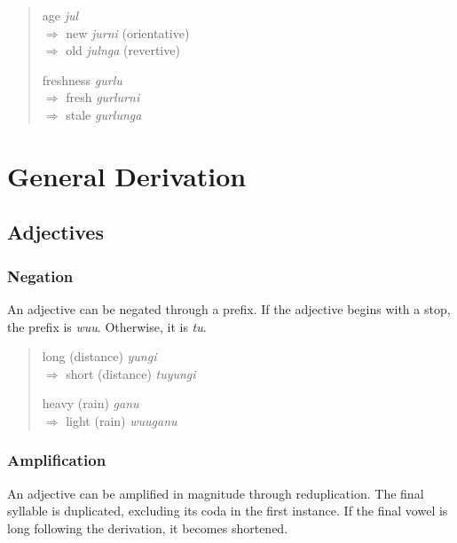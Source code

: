 \begin{quote}
\begin{multicols}{2}
age \textit{jul}\\
$\Rightarrow$ new \textit{jurni} (orientative)\\
$\Rightarrow$ old \textit{julnga} (revertive)

freshness \textit{gurlu}\\
$\Rightarrow$ fresh \textit{gurlurni}\\
$\Rightarrow$ stale \textit{gurlunga}
\end{multicols}
\end{quote}

\section{General Derivation}

\subsection{Adjectives}

\subsubsection{Negation}

An adjective can be negated through a prefix. If the adjective begins with a
stop, the prefix is \textit{wuu}. Otherwise, it is \textit{tu}.

\begin{quote}
\begin{multicols}{2}
long (distance) \textit{yungi}\\
$\Rightarrow$ short (distance) \textit{tuyungi}

heavy (rain) \textit{ganu}\\
$\Rightarrow$ light (rain) \textit{wuuganu}
\end{multicols}
\end{quote}

\subsubsection{Amplification}

An adjective can be amplified in magnitude through reduplication. The final
syllable is duplicated, excluding its coda in the first instance. If the final
vowel is long following the derivation, it becomes shortened.


